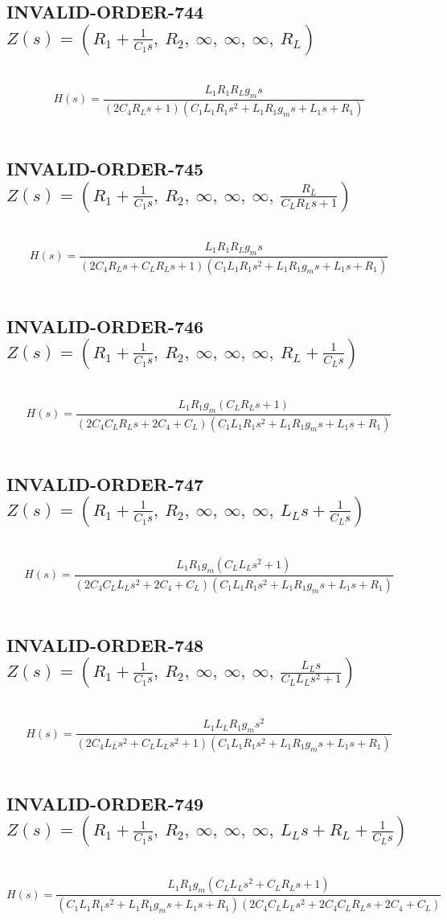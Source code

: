 \documentclass{article}
\begin{document}
\subsection{INVALID-ORDER-744 $Z(s) = \left( R_{1} + \frac{1}{C_{1} s}, \  R_{2}, \  \infty, \  \infty, \  \infty, \  R_{L}\right)$ } \ 
\textbf{\[H(s) = \frac{L_{1} R_{1} R_{L} g_{m} s}{\left(2 C_{4} R_{L} s + 1\right) \left(C_{1} L_{1} R_{1} s^{2} + L_{1} R_{1} g_{m} s + L_{1} s + R_{1}\right)}\] } \ 
\subsection{INVALID-ORDER-745 $Z(s) = \left( R_{1} + \frac{1}{C_{1} s}, \  R_{2}, \  \infty, \  \infty, \  \infty, \  \frac{R_{L}}{C_{L} R_{L} s + 1}\right)$ } \ 
\textbf{\[H(s) = \frac{L_{1} R_{1} R_{L} g_{m} s}{\left(2 C_{4} R_{L} s + C_{L} R_{L} s + 1\right) \left(C_{1} L_{1} R_{1} s^{2} + L_{1} R_{1} g_{m} s + L_{1} s + R_{1}\right)}\] } \ 
\subsection{INVALID-ORDER-746 $Z(s) = \left( R_{1} + \frac{1}{C_{1} s}, \  R_{2}, \  \infty, \  \infty, \  \infty, \  R_{L} + \frac{1}{C_{L} s}\right)$ } \ 
\textbf{\[H(s) = \frac{L_{1} R_{1} g_{m} \left(C_{L} R_{L} s + 1\right)}{\left(2 C_{4} C_{L} R_{L} s + 2 C_{4} + C_{L}\right) \left(C_{1} L_{1} R_{1} s^{2} + L_{1} R_{1} g_{m} s + L_{1} s + R_{1}\right)}\] } \ 
\subsection{INVALID-ORDER-747 $Z(s) = \left( R_{1} + \frac{1}{C_{1} s}, \  R_{2}, \  \infty, \  \infty, \  \infty, \  L_{L} s + \frac{1}{C_{L} s}\right)$ } \ 
\textbf{\[H(s) = \frac{L_{1} R_{1} g_{m} \left(C_{L} L_{L} s^{2} + 1\right)}{\left(2 C_{4} C_{L} L_{L} s^{2} + 2 C_{4} + C_{L}\right) \left(C_{1} L_{1} R_{1} s^{2} + L_{1} R_{1} g_{m} s + L_{1} s + R_{1}\right)}\] } \ 
\subsection{INVALID-ORDER-748 $Z(s) = \left( R_{1} + \frac{1}{C_{1} s}, \  R_{2}, \  \infty, \  \infty, \  \infty, \  \frac{L_{L} s}{C_{L} L_{L} s^{2} + 1}\right)$ } \ 
\textbf{\[H(s) = \frac{L_{1} L_{L} R_{1} g_{m} s^{2}}{\left(2 C_{4} L_{L} s^{2} + C_{L} L_{L} s^{2} + 1\right) \left(C_{1} L_{1} R_{1} s^{2} + L_{1} R_{1} g_{m} s + L_{1} s + R_{1}\right)}\] } \ 
\subsection{INVALID-ORDER-749 $Z(s) = \left( R_{1} + \frac{1}{C_{1} s}, \  R_{2}, \  \infty, \  \infty, \  \infty, \  L_{L} s + R_{L} + \frac{1}{C_{L} s}\right)$ } \ 
\textbf{\[H(s) = \frac{L_{1} R_{1} g_{m} \left(C_{L} L_{L} s^{2} + C_{L} R_{L} s + 1\right)}{\left(C_{1} L_{1} R_{1} s^{2} + L_{1} R_{1} g_{m} s + L_{1} s + R_{1}\right) \left(2 C_{4} C_{L} L_{L} s^{2} + 2 C_{4} C_{L} R_{L} s + 2 C_{4} + C_{L}\right)}\] } \ 
\end{document}
